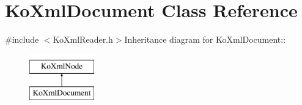 \hypertarget{classKoXmlDocument}{
\section{KoXmlDocument Class Reference}
\label{classKoXmlDocument}
}


{\ttfamily \#include $<$KoXmlReader.h$>$}Inheritance diagram for KoXmlDocument::\begin{figure}[H]
\begin{center}
\leavevmode
\includegraphics[height=2cm]{classKoXmlDocument}
\end{center}
\end{figure}
